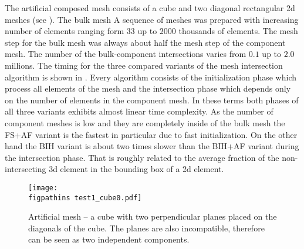 % 

The artificial composed mesh consists of a cube and two diagonal rectangular 2d meshes (see ). The bulk mesh 
A sequence of meshes was prepared with increasing number of elements ranging
form $33$ up to $2000$ thousands of elements. The mesh step for the bulk mesh was always about half the mesh step of the component mesh. 
The number of the bulk-component intersections varies from $0.1$ up to $2.0$ millions. The timing for the three compared variants
of the mesh intersection algorithm is shown in . Every algorithm consists of the initialization phase which process all elements of the mesh 
and the intersection phase which depends only on the number of elements in the component mesh. In these terms both phases of all three variants exhibits almost 
linear time complexity. As the number of component meshes is low and they are completely inside of the bulk mesh the FS+AF variant is the fastest in particular
due to fast initialization. On the other hand the BIH variant is about two times slower than the BIH+AF variant during the intersection phase. 
That is roughly related to the average fraction of the non-intersecting 3d element in the bounding box of a 2d element.


\begin{figure}[!htb]
    \centering
    \texttt{[image: \\figpathins test1\_cube0.pdf]}
    \caption[Cube intersected by two diagonal fractures.]
    {Artificial mesh -- a cube with two perpendicular planes placed on the diagonals of the cube.
        The planes are also incompatible, therefore can be seen as two independent components.}
    \label{fig:cube_mesh}
\end{figure}
  
